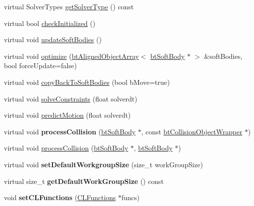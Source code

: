 \begin{DoxyCompactItemize}
\item 
virtual Solver\+Types \hyperlink{classbt_open_c_l_soft_body_solver_a2eedd12ceb00f9a598e9d405daff5a08}{get\+Solver\+Type} () const 
\item 
virtual bool \hyperlink{classbt_open_c_l_soft_body_solver_a7cafc88f5845c099ce33fb6c5b84968e}{check\+Initialized} ()
\item 
virtual void \hyperlink{classbt_open_c_l_soft_body_solver_ae37f7bd6f4ab0c4b8eb26fb1c104644a}{update\+Soft\+Bodies} ()
\item 
virtual void \hyperlink{classbt_open_c_l_soft_body_solver_a1340686f32dcdd4e8f36a56788a2e51c}{optimize} (\hyperlink{classbt_aligned_object_array}{bt\+Aligned\+Object\+Array}$<$ \hyperlink{classbt_soft_body}{bt\+Soft\+Body} $\ast$ $>$ \&soft\+Bodies, bool force\+Update=false)
\item 
virtual void \hyperlink{classbt_open_c_l_soft_body_solver_ab5490d39c1bf489ed33d6e6a4582f93b}{copy\+Back\+To\+Soft\+Bodies} (bool b\+Move=true)
\item 
virtual void \hyperlink{classbt_open_c_l_soft_body_solver_a24daba36a553aeb1d49158cd804e039a}{solve\+Constraints} (float solverdt)
\item 
virtual void \hyperlink{classbt_open_c_l_soft_body_solver_ab48872d1de7b5b960d462c71d36ee92d}{predict\+Motion} (float solverdt)
\item 
\hypertarget{classbt_open_c_l_soft_body_solver_a355451dec750aa4205c9750aa65c1849}{virtual void {\bfseries process\+Collision} (\hyperlink{classbt_soft_body}{bt\+Soft\+Body} $\ast$, const \hyperlink{structbt_collision_object_wrapper}{bt\+Collision\+Object\+Wrapper} $\ast$)}\label{classbt_open_c_l_soft_body_solver_a355451dec750aa4205c9750aa65c1849}

\item 
virtual void \hyperlink{classbt_open_c_l_soft_body_solver_a79c0fb52b0e405fec3ea991e2bf8ec29}{process\+Collision} (\hyperlink{classbt_soft_body}{bt\+Soft\+Body} $\ast$, \hyperlink{classbt_soft_body}{bt\+Soft\+Body} $\ast$)
\item 
\hypertarget{classbt_open_c_l_soft_body_solver_af977b199072c53ed3b1fe649257fce95}{virtual void {\bfseries set\+Default\+Workgroup\+Size} (size\+\_\+t work\+Group\+Size)}\label{classbt_open_c_l_soft_body_solver_af977b199072c53ed3b1fe649257fce95}

\item 
\hypertarget{classbt_open_c_l_soft_body_solver_aa8d24804174ef36071af3b3dea85ff3f}{virtual size\+\_\+t {\bfseries get\+Default\+Work\+Group\+Size} () const }\label{classbt_open_c_l_soft_body_solver_aa8d24804174ef36071af3b3dea85ff3f}

\item 
\hypertarget{classbt_open_c_l_soft_body_solver_a121183088db6d037d60602621bf7773f}{void {\bfseries set\+C\+L\+Functions} (\hyperlink{class_c_l_functions}{C\+L\+Functions} $\ast$funcs)}\label{classbt_open_c_l_soft_body_solver_a121183088db6d037d60602621bf7773f}

\end{DoxyCompactItemize}
